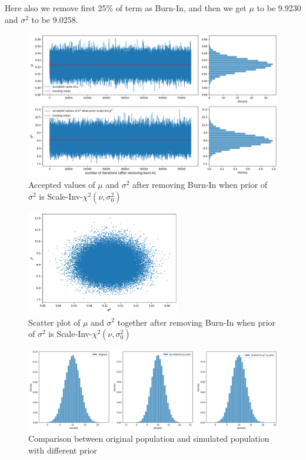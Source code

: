 \begin{example}
    Here also we remove first 25\% of term as Burn-In, and then we get $ \mu $ to be 9.9230 and $ \sigma^{2} $ to be 9.0258.  
    
    \begin{figure}[H]
        \centering
        \includegraphics[width=1\textwidth]{images/gibbs/example3/chi2-post-burnin.png}
        \caption{Accepted values of $ \mu $ and $ \sigma^{2} $ after removing Burn-In when prior of $ \sigma^{2} $ is Scale-Inv-$\chi^{2}(\nu,\sigma^{2}_0)$}
    \end{figure}

    \begin{figure}[H]
        \centering
        \includegraphics[width=0.6\textwidth]{images/gibbs/example3/chi2-scatter-post-burnin.png}
        \caption{Scatter plot of $ \mu $ and $ \sigma^{2} $ together after removing Burn-In when prior of $ \sigma^{2} $ is Scale-Inv-$\chi^{2}(\nu,\sigma^{2}_0)$}
    \end{figure}

    \begin{figure}[H]
        \centering
        \includegraphics[width=1\textwidth]{images/gibbs/example3/comparisum.png}
        \caption{Comparison between original population and simulated population with different prior}
    \end{figure}

 \end{example}


